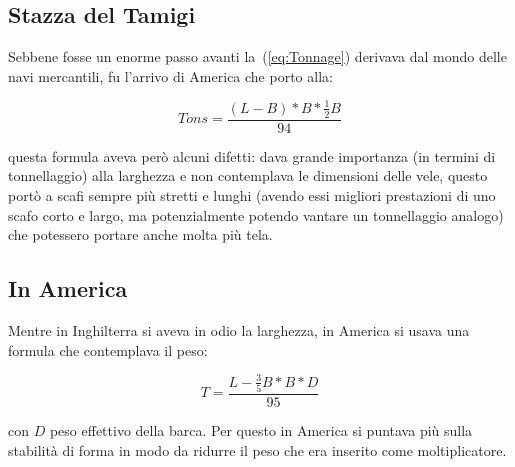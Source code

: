		\subsection{Stazza del Tamigi}
		
			Sebbene fosse un enorme passo avanti la~(\ref{eq:Tonnage}) derivava dal mondo delle navi mercantili, fu l'arrivo di America che porto alla:
		
			\begin{center}
				\begin{equation}
					Tons=\frac{(L-B)*B*\frac{1}{2}B}{94}
					\label{eq:Thames}
				\end{equation}
			\end{center}
		
			questa formula aveva però alcuni difetti: dava grande importanza (in termini di tonnellaggio) alla larghezza e non contemplava le dimensioni delle vele, questo portò a scafi sempre più stretti e lunghi (avendo essi migliori prestazioni di uno scafo corto e largo, ma potenzialmente potendo vantare un tonnellaggio analogo) che potessero portare anche molta più tela.
		
		\subsection{In America}
			Mentre in Inghilterra si aveva in odio la larghezza, in America si usava una formula che contemplava il peso:
			\begin{center}
				\begin{equation}
					T=\frac{L-\frac{3}{5}B*B*D}{95}
					\label{eq:America}
				\end{equation}
			\end{center}
			con $D$ peso effettivo della barca.
			Per questo in America si puntava più sulla stabilità di forma in modo da ridurre il peso che era inserito come moltiplicatore.
